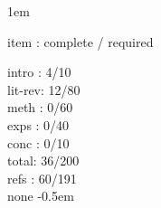\documentclass[12pt]{book}
\begin{document}
\raggedbottom
\setlength{\oddsidemargin}{53pt}
\setlength{\evensidemargin}{53pt}
\setlength{\marginparwidth}{57pt}
\setlength{\footskip}{30pt}
\openup 1em

\frontmatter
%

\tableofcontents
\listoffigures
\listoftables
\mainmatter
item : complete / required

intro : 4/10\\
lit-rev: 12/80\\
meth : 0/60\\
exps : 0/40\\
conc : 0/10\\

total: 36/200\\
refs : 60/191\\

\appendix
none
\backmatter
\openup -0.5em
%


\end{document}
